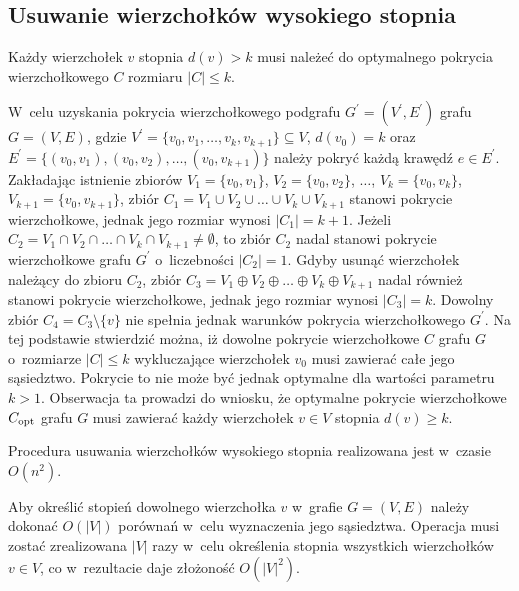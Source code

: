 \subsection{Usuwanie wierzchołków wysokiego stopnia}\label{section_kernelization_high-degree}

\begin{theorem}
  Każdy wierzchołek $v$ stopnia $d(v) > k$ musi należeć do optymalnego pokrycia wierzchołkowego 
  $C$ rozmiaru $|C| \leq k$.
\end{theorem}
\begin{bproof}
  W~celu uzyskania pokrycia wierzchołkowego podgrafu $G^\prime=(V^\prime,E^\prime)$
  grafu $G=(V,E)$, gdzie $V^\prime=\{v_0, v_1, \ldots, v_k, v_{k+1}\} \subseteq V$, $d(v_0)=k$ oraz \\
  $E^\prime=\{(v_0,v_1), (v_0,v_2), \ldots, (v_0,v_{k+1})\}$ należy pokryć każdą krawędź $e \in E^\prime$.
  Zakładając istnienie zbiorów $V_1=\{v_0,v_1\}$, $V_2=\{v_0,v_2\}$, $\ldots $,
  $V_k=\{v_0,v_k\}$, $V_{k+1}=\{v_0,v_{k+1}\}$, zbiór $C_1=V_1 \cup V_2 \cup \ldots \cup V_k \cup V_{k+1}$ stanowi pokrycie wierzchołkowe, jednak jego rozmiar wynosi $|C_1| = k + 1$.
  Jeżeli $C_2=V_1 \cap V_2 \cap \ldots \cap V_k \cap V_{k+1} \neq \emptyset$, to zbiór $C_2$ nadal stanowi pokrycie wierzchołkowe grafu $G^\prime$ o~liczebności
  $|C_2|=1$.
  Gdyby usunąć wierzchołek należący do zbioru $C_2$, zbiór $C_3=V_1 \oplus V_2 \oplus \ldots \oplus V_k \oplus V_{k+1}$ nadal
  również stanowi pokrycie wierzchołkowe, jednak jego rozmiar wynosi $|C_3|=k$.
  Dowolny zbiór $C_4=C_3 \setminus \{v\}$ nie spełnia jednak warunków pokrycia wierzchołkowego $G^\prime$.
  Na tej podstawie stwierdzić można, iż dowolne pokrycie wierzchołkowe $C$ grafu $G$ o~rozmiarze $|C| \leq k$ wykluczające wierzchołek $v_0$ musi zawierać całe jego
  sąsiedztwo.
  Pokrycie to nie może być jednak optymalne dla wartości parametru $k > 1$.
  Obserwacja ta prowadzi do wniosku, że optymalne pokrycie wierzchołkowe $C_{\textnormal{opt}}$ grafu $G$ musi zawierać każdy wierzchołek $v \in V$ stopnia $d(v) \geq k$.
\end{bproof}

\begin{theorem}
  Procedura usuwania wierzchołków wysokiego stopnia realizowana jest w~czasie $O(n^2)$.
\end{theorem}
\begin{bproof}
  Aby określić stopień dowolnego wierzchołka $v$ w~grafie $G=(V,E)$ należy dokonać $O(|V|)$ porównań w~celu wyznaczenia jego sąsiedztwa.
  Operacja musi zostać zrealizowana $|V|$ razy w~celu określenia stopnia wszystkich wierzchołków $v \in V$, co w~rezultacie daje złożoność $O (|V|^2)$.
\end{bproof}

